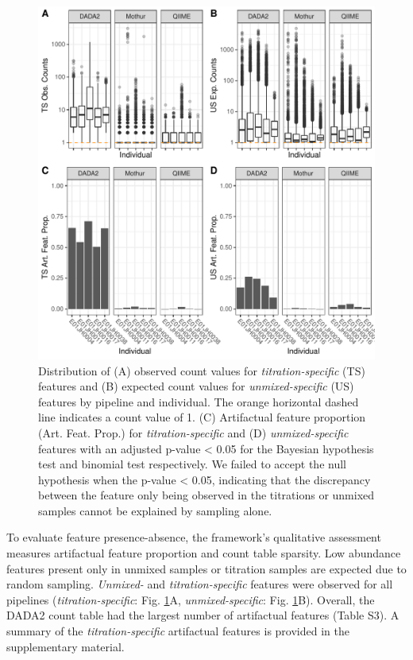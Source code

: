 \documentclass[linenumbers]{bmcart}
\begin{document}
\begin{figure}
\centering
\includegraphics{qualPlot-1.pdf}
\caption{\label{fig:qualPlot}Distribution of (A) observed count values for
\emph{titration-specific} (TS) features and (B) expected count values for
\emph{unmixed-specific} (US) features by pipeline and individual. The orange
horizontal dashed line indicates a count value of 1. (C) Artifactual feature proportion (Art. Feat. Prop.) for
\emph{titration-specific} and (D) \emph{unmixed-specific} features with an
adjusted p-value \textless{} 0.05 for the Bayesian hypothesis test and
binomial test respectively. We failed to accept the null hypothesis when
the p-value \textless{} 0.05, indicating that the discrepancy between
the feature only being observed in the titrations or unmixed samples
cannot be explained by sampling alone.}
\end{figure}

To evaluate feature presence-absence, the framework's qualitative assessment measures
artifactual feature proportion and count table sparsity.
Low abundance features
present only in unmixed samples or titration samples are expected due to random
sampling. \emph{Unmixed-} and \emph{titration-specific} features were observed for all pipelines
(\emph{titration-specific}: Fig. \ref{fig:qualPlot}A, \emph{unmixed-specific}: Fig.
\ref{fig:qualPlot}B). Overall, the DADA2 count table had the largest
number of artifactual features (Table S3). 
A summary of the \emph{titration-specific} artifactual features is provided in the supplementary material.
\end{document}
